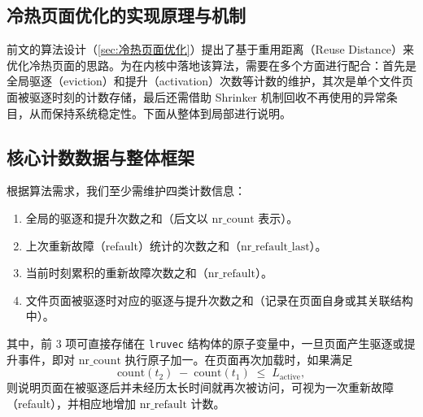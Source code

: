 



\subsection{冷热页面优化的实现原理与机制}

前文的算法设计（\ref{sec:冷热页面优化}）提出了基于重用距离（Reuse Distance）来优化冷热页面的思路。为在内核中落地该算法，需要在多个方面进行配合：首先是全局驱逐（eviction）和提升（activation）次数等计数的维护，其次是单个文件页面被驱逐时刻的计数存储，最后还需借助 Shrinker 机制回收不再使用的异常条目，从而保持系统稳定性。下面从整体到局部进行说明。

\subsection{核心计数数据与整体框架}

根据算法需求，我们至少需维护四类计数信息：
\begin{enumerate}
  \item 全局的驱逐和提升次数之和（后文以 \(\mathrm{nr\_count}\) 表示）。
  \item 上次重新故障（refault）统计的次数之和（\(\mathrm{nr\_refault\_last}\)）。
  \item 当前时刻累积的重新故障次数之和（\(\mathrm{nr\_refault}\)）。
  \item 文件页面被驱逐时对应的驱逐与提升次数之和（记录在页面自身或其关联结构中）。
\end{enumerate}

其中，前 3 项可直接存储在 \texttt{lruvec} 结构体的原子变量中，一旦页面产生驱逐或提升事件，即对 \(\mathrm{nr\_count}\) 执行原子加一。在页面再次加载时，如果满足
\[
  \mathrm{count}(t_2) \;-\; \mathrm{count}(t_1)
  \;\le\;
  L_{\mathrm{active}},
\]
则说明页面在被驱逐后并未经历太长时间就再次被访问，可视为一次重新故障（refault），并相应地增加 \(\mathrm{nr\_refault}\) 计数。

